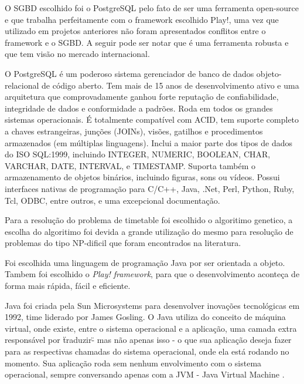 
O SGBD escolhido foi o PostgreSQL pelo fato de ser uma ferramenta open-source e que trabalha perfeitamente com o framework escolhido Play!, uma vez que utilizado em projetos anteriores não foram apresentados conflitos entre o framework e o SGBD. A seguir pode ser notar que é uma ferramenta robusta e que tem visão no mercado internacional.\par

O PostgreSQL é um poderoso sistema gerenciador de banco de dados objeto-relacional de código aberto.  Tem mais de 15 anos de desenvolvimento ativo e uma arquitetura que comprovadamente ganhou forte reputação de confiabilidade, integridade de dados e conformidade a padrões.  Roda em todos os grandes sistemas operacionais. É totalmente compatível com ACID, tem suporte completo a chaves estrangeiras, junções (JOINs), visões, gatilhos e procedimentos armazenados (em múltiplas linguagens).  Inclui a maior parte dos tipos de dados do ISO SQL:1999, incluindo INTEGER, NUMERIC, BOOLEAN, CHAR, VARCHAR, DATE, INTERVAL, e TIMESTAMP.  Suporta também o armazenamento de objetos binários, incluindo figuras, sons ou vídeos.  Possui interfaces nativas de programação para C/C++, Java, .Net, Perl, Python, Ruby, Tcl, ODBC, entre outros, e uma excepcional documentação.\cite{postgresql}



Para a resolução do problema de timetable foi escolhido o algoritimo genetico, a escolha do algoritimo foi devida a grande utilização do mesmo para resolução de problemas do tipo NP-dificil que foram encontrados na literatura.
\par





Foi escolhida uma linguagem de programação Java por ser orientada a objeto. Tambem foi escolhido o \textit{Play! framework}, para que o desenvolvimento aconteça de forma mais rápida, fácil e eficiente.\par

Java foi criada pela Sun Microsystems para desenvolver inovações tecnológicas em 1992, time liderado por James Gosling. O Java utiliza do conceito de máquina virtual, onde existe, entre o sistema operacional e a aplicação, uma camada extra responsável por \"traduzir\" - mas não apenas isso - o que sua aplicação deseja fazer para as respectivas chamadas do sistema operacional, onde ela está rodando no momento. Sua aplicação roda sem nenhum envolvimento com o sistema operacional, sempre conversando apenas com a JVM - Java Virtual Machine \cite{caelum}.\par

